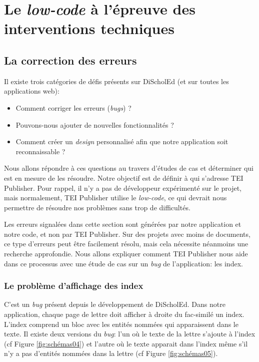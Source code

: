 \part{Le \textit{low-code} à l'épreuve des interventions techniques}
\setcounter{chapter}{0}

\chapter{La correction des erreurs}

Il existe trois catégories de défis présents sur DiScholEd (et sur toutes les applications web): 
\begin{itemize}[label=\textbullet]
\item Comment corriger les erreurs (\textit{bugs}) ?
\item Pouvons-nous ajouter de nouvelles fonctionnalités ?
\item Comment créer un \textit{design} personnalisé afin que notre application soit reconnaissable ?
\end{itemize}

Nous allons répondre à ces questions au travers d'études de cas et déterminer qui est en mesure de les résoudre. Notre objectif est de définir à qui s'adresse TEI Publisher. Pour rappel, il n'y a pas de développeur expérimenté sur le projet, mais normalement, TEI Publisher utilise le \textit{low-code}, ce qui devrait nous permettre de résoudre nos problèmes sans trop de difficultés.

Les erreurs signalées dans cette section sont générées par notre application et notre code, et non par TEI Publisher. Sur des projets avec moins de documents, ce type d'erreurs peut être facilement résolu, mais cela nécessite néanmoins une recherche approfondie. Nous allons expliquer comment TEI Publisher nous aide dans ce processus avec une étude de cas sur un \textit{bug} de l'application: les index.

\section{Le problème d'affichage des index}

C'est un \textit{bug} présent depuis le développement de DiScholEd. Dans notre application, chaque page de lettre doit afficher à droite du fac-similé un index. L'index comprend un bloc avec les entités nommées qui apparaissent dans le texte.
Il existe deux versions du \textit{bug}: l'un où le texte de la lettre s'ajoute à l'index (cf Figure \ref{fig:schémas04}) et l'autre où le texte apparait dans l'index même s'il n'y a pas d'entités nommées dans la lettre (cf Figure \ref{fig:schémas05}).

